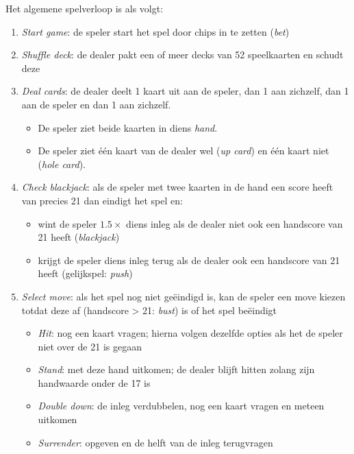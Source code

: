 \documentclass[dutch,a4paper,12pt,doubleside]{book}
\begin{document}
Het algemene spelverloop is als volgt:
\begin{enumerate}
    \item \textit{Start game}: de speler start het spel door chips in te zetten (\textit{bet})
    \item \textit{Shuffle deck}: de dealer pakt een of meer decks van 52 speelkaarten en schudt deze 
    \item \textit{Deal cards}: de dealer deelt 1 kaart uit aan de speler, dan 1 aan zichzelf, dan 1 aan de speler en dan 1 aan zichzelf.
        \begin{itemize}
            \item De speler ziet beide kaarten in diens \textit{hand}.
            \item De speler ziet één kaart van de dealer wel (\textit{up card}) en één kaart niet (\textit{hole card}).
        \end{itemize}
    \item \textit{Check blackjack}: als de speler met twee kaarten in de hand een score heeft van precies 21
        dan eindigt het spel en:
        \begin{itemize}
            \item wint de speler $1.5\times$ diens inleg als de dealer niet ook een handscore van 21 heeft (\textit{blackjack})
            \item krijgt de speler diens inleg terug als de dealer ook een handscore van 21 heeft (gelijkspel: \textit{push})
        \end{itemize}
    \item \textit{Select move}: als het spel nog niet geëindigd is, kan de speler een move kiezen totdat deze af 
    (handscore > 21: \textit{bust}) is of het spel beëindigt
        \begin{itemize}
            \item \textit{Hit}: nog een kaart vragen; hierna volgen dezelfde opties als het de speler niet over de 21 is gegaan
            \item \textit{Stand}: met deze hand uitkomen; de dealer blijft hitten zolang zijn handwaarde onder de 17 is
            \item \textit{Double down}: de inleg verdubbelen, nog een kaart vragen en meteen uitkomen 
            \item \textit{Surrender}: opgeven en de helft van de inleg terugvragen 
        \end{itemize}
\end{enumerate}
\end{document}

